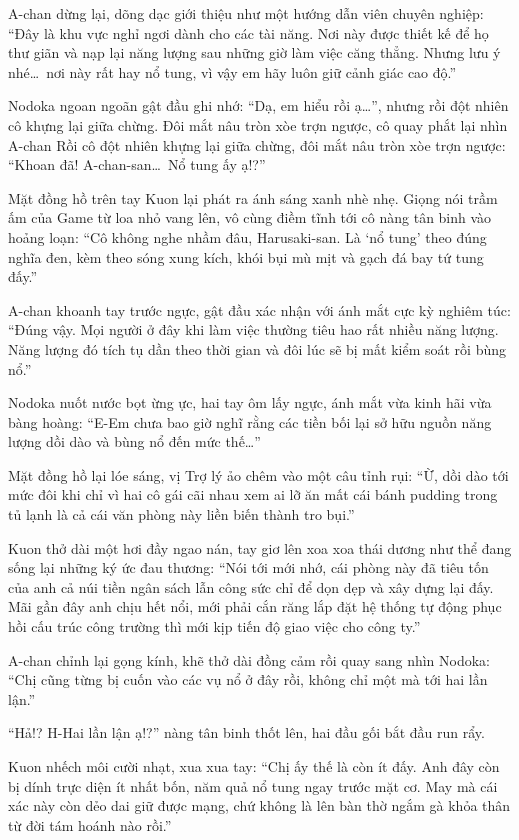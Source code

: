 \documentclass[../main.tex]{subfiles}
\begin{document}
A-chan dừng lại, dõng dạc giới thiệu như một hướng dẫn viên chuyên nghiệp: ``Đây là khu vực nghỉ ngơi dành cho các tài năng. Nơi này được thiết kế để họ thư giãn và nạp lại năng lượng sau những giờ làm việc căng thẳng. Nhưng lưu ý nhé\dots\ nơi này rất hay nổ tung, vì vậy em hãy luôn giữ cảnh giác cao độ.''

Nodoka ngoan ngoãn gật đầu ghi nhớ: ``Dạ, em hiểu rồi ạ\dots'', nhưng rồi đột nhiên cô khựng lại giữa chừng. Đôi mắt nâu tròn xòe trợn ngược, cô quay phắt lại nhìn A-chan Rồi cô đột nhiên khựng lại giữa chừng, đôi mắt nâu tròn xòe trợn ngược: ``Khoan đã! A-chan-san\dots\ Nổ tung ấy ạ!?''

Mặt đồng hồ trên tay Kuon lại phát ra ánh sáng xanh nhè nhẹ. Giọng nói trầm ấm của Game từ loa nhỏ vang lên, vô cùng điềm tĩnh tới cô nàng tân binh vào hoảng loạn: ``Cô không nghe nhầm đâu, Harusaki-san. Là `nổ tung' theo đúng nghĩa đen, kèm theo sóng xung kích, khói bụi mù mịt và gạch đá bay tứ tung đấy.''

A-chan khoanh tay trước ngực, gật đầu xác nhận với ánh mắt cực kỳ nghiêm túc: ``Đúng vậy. Mọi người ở đây khi làm việc thường tiêu hao rất nhiều năng lượng. Năng lượng đó tích tụ dần theo thời gian và đôi lúc sẽ bị mất kiểm soát rồi bùng nổ.''

Nodoka nuốt nước bọt ừng ực, hai tay ôm lấy ngực, ánh mắt vừa kinh hãi vừa bàng hoàng: ``E-Em chưa bao giờ nghĩ rằng các tiền bối lại sở hữu nguồn năng lượng dồi dào và bùng nổ đến mức thế\dots''

Mặt đồng hồ lại lóe sáng, vị Trợ lý ảo chêm vào một câu tỉnh rụi: ``Ừ, dồi dào tới mức đôi khi chỉ vì hai cô gái cãi nhau xem ai lỡ ăn mất cái bánh pudding trong tủ lạnh là cả cái văn phòng này liền biến thành tro bụi.''

Kuon thở dài một hơi đầy ngao nán, tay giơ lên xoa xoa thái dương như thể đang sống lại những ký ức đau thương: ``Nói tới mới nhớ, cái phòng này đã tiêu tốn của anh cả núi tiền ngân sách lẫn công sức chỉ để dọn dẹp và xây dựng lại đấy. Mãi gần đây anh chịu hết nổi, mới phải cắn răng lắp đặt hệ thống tự động phục hồi cấu trúc công trường thì mới kịp tiến độ giao việc cho công ty.''

A-chan chỉnh lại gọng kính, khẽ thở dài đồng cảm rồi quay sang nhìn Nodoka: ``Chị cũng từng bị cuốn vào các vụ nổ ở đây rồi, không chỉ một mà tới hai lần lận.''

``Hả!? H-Hai lần lận ạ!?'' nàng tân binh thốt lên, hai đầu gối bắt đầu run rẩy.

Kuon nhếch môi cười nhạt, xua xua tay: ``Chị ấy thế là còn ít đấy. Anh đây còn bị dính trực diện ít nhất bốn, năm quả nổ tung ngay trước mặt cơ. May mà cái xác này còn dẻo dai giữ được mạng, chứ không là lên bàn thờ ngắm gà khỏa thân từ đời tám hoánh nào rồi.''
\end{document}
